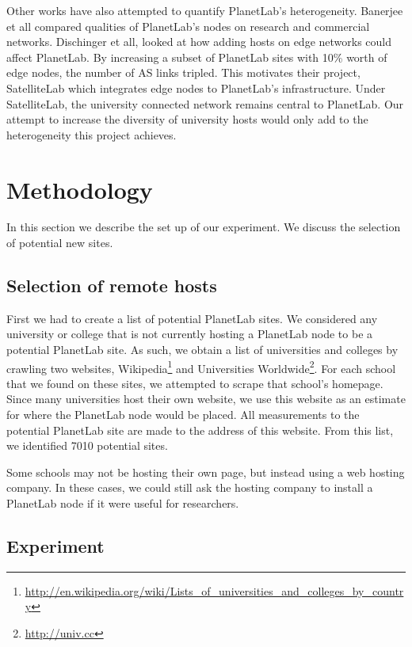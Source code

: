 \documentclass{sig-alternate-10pt}
\begin{document}
Other works have also attempted to quantify PlanetLab’s heterogeneity. Banerjee
et all compared qualities of PlanetLab’s nodes on research and commercial
networks. Dischinger et all, looked at how adding hosts on edge networks could
affect PlanetLab. By increasing a subset of PlanetLab sites with 10\% worth of
edge nodes, the number of AS links tripled. This motivates their project,
SatelliteLab which integrates edge nodes to PlanetLab’s infrastructure. Under
SatelliteLab, the university connected network remains central to PlanetLab.
Our attempt to increase the diversity of university hosts would only add to the
heterogeneity this project achieves.



\section{Methodology}

In this section we describe the set up of our experiment. We discuss the
selection of potential new sites. 

\subsection{Selection of remote hosts}

First we had to create a list of potential PlanetLab sites. We considered any
university or college that is not currently hosting a PlanetLab node to be a
potential PlanetLab site. As such, we obtain a list of universities and
colleges by crawling two websites,
Wikipedia\footnote{\url{http://en.wikipedia.org/wiki/Lists_of_universities_and_colleges_by_country}}
and Universities Worldwide\footnote{\url{http://univ.cc}}. For each school that
we found on these sites, we attempted to scrape that school's homepage. Since
many universities host their own website, we use this website as an estimate
for where the PlanetLab node would be placed. All measurements to the potential
PlanetLab site are made to the address of this website. From this list, we
identified 7010 potential sites.

Some schools may not be hosting their own page, but instead using a web hosting
company. In these cases, we could still ask the hosting company to install a
PlanetLab node if it were useful for researchers.

\subsection{Experiment}
\end{document}
